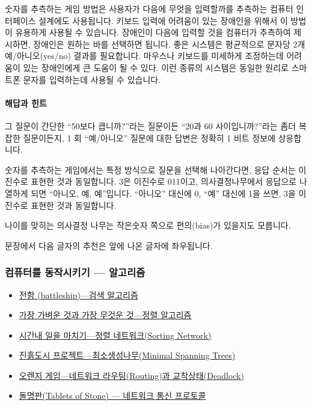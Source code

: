 \documentclass[]{article}
\begin{document}
숫자를 추측하는 게임 방법은 사용자가 다음에 무엇을 입력할까를 추측하는
컴퓨터 인터페이스 설계에도 사용됩니다. 키보드 입력에 어려움이 있는
장애인을 위해서 이 방법이 유용하게 사용될 수 있습니다. 장애인이 다음에
입력할 것을 컴퓨터가 추측하여 제시하면, 장애인은 원하는 바를 선택하면
됩니다. 좋은 시스템은 평균적으로 문자당 2개 예/아니오(yes/no) 결과를
필요합니다. 마우스나 키보드를 미세하게 조정하는데 어려움이 있는
장애인에게 큰 도움이 될 수 있다. 이런 종류의 시스템은 동일한 원리로
스마트폰 문자를 입력하는데 사용될 수 있습니다.

\mbox{}\paragraph{해답과 힌트}\label{section-85}

그 질문이 간단한 ``50보다 큽니까?''라는 질문이든 ``20과 60
사이입니까?''라는 좀더 복잡한 질문이든지, 1 회 ``예/아니오'' 질문에 대한
답변은 정확히 1 비트 정보에 상응합니다.

숫자를 추측하는 게임에서는 특정 방식으로 질문을 선택해 나아간다면, 응답
순서는 이진수로 표현한 것과 동일합니다. 3은 이진수로 011이고,
의사결정나무에서 응답으로 나열하게 되면 ``아니오, 예, 예''입니다.
``아니오'' 대신에 0, ``예'' 대신에 1을 쓰면, 3을 이진수로 표현한 것과
동일합니다.

나이를 맞히는 의사결정 나무는 작은숫자 쪽으로 편의(bias)가 있을지도
모릅니다.

문장에서 다음 글자의 추천은 앞에 나온 글자에 좌우됩니다.


\subsubsection{컴퓨터를 동작시키기 --- 알고리즘}\label{mdash--1}

\begin{itemize}
\itemsep1pt\parskip0pt
\item
  \href{csunplugged/02-part/06-searching-algorithm.html}{전함
  (battleship)---검색 알고리즘}
\item
  \href{csunplugged/02-part/07-sorting-algorithm.html}{가장 가벼운 것과
  가장 무것운 것---정렬 알고리즘}
\item
  \href{csunplugged/02-part/08-sorting-networks.html}{시간내 일을
  마치기---정렬 네트워크(Sorting Network)}
\item
  \href{csunplugged/02-part/09-minimal-spanning-tree.html}{진흙도시
  프로젝트---최소생성나무(Minimal Spanning Trees)}
\item
  \href{csunplugged/02-part/10-routing-deadlock.html}{오렌지
  게임---네트워크 라우팅(Routing)과 교착상태(Deadlock)}
\item
  \href{csunplugged/02-part/11-internet.html}{돌명판(Tablets of Stone)
  --- 네트워크 통신 프로토콜}
\end{itemize}
\end{document}
